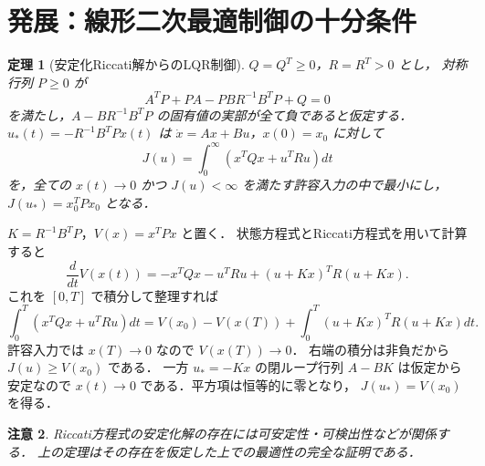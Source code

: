 \documentclass[a5paper,10pt,onecolumn]{jsarticle}
\makeatletter
\theoremstyle{mathnotetheorem}
\newtheorem{theorem}{定理}[section]
\newtheorem{remark}[theorem]{注意}
\renewcommand{\proofname}{証明}
\renewenvironment{proof}[1][\proofname]{%
  \par\pushQED{\qed}\normalfont\topsep4\p@\@plus2\p@\relax
  \trivlist\item[\hskip\labelsep\bfseries #1]\ignorespaces
}{\popQED\endtrivlist\@endpefalse}
\makeatother
\begin{document}
\section{発展：線形二次最適制御の十分条件}
\begin{theorem}[安定化Riccati解からのLQR制御]
$Q=Q^T\ge0$，$R=R^T>0$ とし，
対称行列 $P\ge0$ が
\[
 A^TP+PA-PBR^{-1}B^TP+Q=0
\]
を満たし，$A-BR^{-1}B^TP$ の固有値の実部が全て負であると仮定する．
$u_*(t)=-R^{-1}B^TPx(t)$ は
$\dot x=Ax+Bu$，$x(0)=x_0$ に対して
\[
 J(u)=\int_0^\infty(x^TQx+u^TRu)dt
\]
を，全ての $x(t)\to0$ かつ $J(u)<\infty$ を満たす許容入力の中で最小にし，
$J(u_*)=x_0^TPx_0$ となる．
\end{theorem}
\begin{proof}
$K=R^{-1}B^TP$，$V(x)=x^TPx$ と置く．
状態方程式とRiccati方程式を用いて計算すると
\[
 \frac d{dt}V(x(t))
 =-x^TQx-u^TRu+(u+Kx)^TR(u+Kx).
\]
これを $[0,T]$ で積分して整理すれば
\[
 \int_0^T(x^TQx+u^TRu)dt
 =V(x_0)-V(x(T))+
 \int_0^T(u+Kx)^TR(u+Kx)dt.
\]
許容入力では $x(T)\to0$ なので $V(x(T))\to0$．
右端の積分は非負だから $J(u)\ge V(x_0)$ である．
一方 $u_*=-Kx$ の閉ループ行列 $A-BK$ は仮定から安定なので
$x(t)\to0$ である．平方項は恒等的に零となり，
$J(u_*)=V(x_0)$ を得る．
\end{proof}
\begin{remark}
Riccati方程式の安定化解の存在には可安定性・可検出性などが関係する．
上の定理はその存在を仮定した上での最適性の完全な証明である．
\end{remark}
\end{document}
